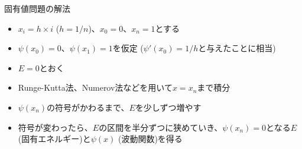 \begin{frame}[t,fragile]{固有値問題の解法}
  \begin{itemize}
    \setlength{\itemsep}{1em}
  \item $x_i=h \times i$ ($h=1/n$)、$x_0=0$、$x_n=1$とする
  \item $\psi(x_0)=0$、$\psi(x_1) = 1$を仮定 ($\psi'(x_0)=1/h$と与えたことに相当)
  \item $E = 0$とおく
  \item Runge-Kutta法、Numerov法などを用いて$x=x_n$まで積分
  \item $\psi(x_n)$の符号がかわるまで、$E$を少しずつ増やす
  \item 符号が変わったら、$E$の区間を半分ずつに狭めていき、$\psi(x_n)=0$となる$E$ (固有エネルギー)と$\psi(x)$ (波動関数)を得る
  \end{itemize}
\end{frame}
